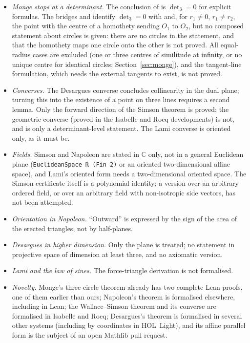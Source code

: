 \documentclass[11pt]{article}
\theoremstyle{definition}
\theoremstyle{remark}
\newcommand{\lean}[1]{\texttt{#1}}
\newcommand{\CC}{\mathbb{C}}
\begin{document}
\begin{itemize}
\item \emph{Monge stops at a determinant.} The conclusion of  is $\det_3=0$ for
explicit formulas. The bridges  and
 identify $\det_3=0$ with  and, for
$r_1\ne0$, $r_1\ne r_2$, the point  with the centre of a homothety sending $O_1$
to $O_2$, but no composed statement about circles is given: there are no circles in the
statement, and that the homothety maps one circle onto the other is not proved. All equal-radius cases are
excluded (one or three centres of similitude at infinity, or no unique centre for identical
circles; Section~\ref{sec:monge}), and the tangent-line formulation, which needs the external
tangents to exist, is not proved.
\item \emph{Converses.} The Desargues converse concludes collinearity in the dual plane; turning
this into the existence of a point on three lines requires a second lemma. Only the forward
direction of the Simson theorem is proved; the geometric converse (proved in the Isabelle and Rocq
developments) is not, and  is only a determinant-level
statement. The Lami converse is oriented only, as it must be.
\item \emph{Fields.} Simson and Napoleon are stated in $\CC$ only, not in a general Euclidean
plane (\lean{EuclideanSpace ℝ (Fin 2)} or an oriented two-dimensional affine space), and Lami's
oriented form needs a two-dimensional oriented space. The Simson certificate itself is a
polynomial identity; a version over an arbitrary ordered field, or over an arbitrary field with
non-isotropic side vectors, has not been attempted.
\item \emph{Orientation in Napoleon.} ``Outward'' is expressed by the sign of the area of the
erected triangles, not by half-planes.
\item \emph{Desargues in higher dimension.} Only the plane is treated; no statement in projective
space of dimension at least three, and no axiomatic version.
\item \emph{Lami and the law of sines.} The force-triangle derivation is not formalised.
\item \emph{Novelty.} Monge's three-circle theorem already has two complete Lean proofs, one of
them earlier than ours; Napoleon's theorem is formalised elsewhere, including in Lean; the
Wallace--Simson theorem and its converse are formalised in Isabelle and Rocq; Desargues's theorem
is formalised in several other systems (including by coordinates in HOL~Light), and its affine
parallel form is the subject of an open Mathlib pull request.
\end{itemize}
\end{document}
